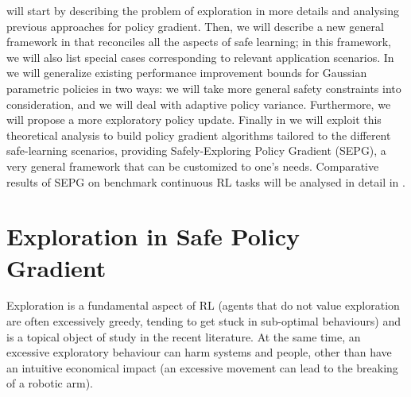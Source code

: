  will start by describing the problem of exploration in more details and analysing previous approaches for policy gradient. Then, we will describe a new general framework in  that reconciles all the aspects of safe learning; in this framework, we will also list special cases corresponding to relevant application scenarios. In  we will generalize existing performance improvement bounds for Gaussian parametric policies in two ways: we will take more general safety constraints into consideration, and we will deal with adaptive policy variance. Furthermore, we will propose a more exploratory policy update. Finally in  we will exploit this theoretical analysis to build policy gradient algorithms tailored to the different safe-learning scenarios, providing Safely-Exploring Policy Gradient (SEPG), a very general framework that can be customized to one's needs. Comparative results of SEPG on benchmark continuous RL tasks will be analysed in detail in .

\section{Exploration in Safe Policy Gradient}\label{sec:sepg-intro}
Exploration is a fundamental aspect of RL (agents that do not value exploration are often excessively greedy, tending to get stuck in sub-optimal behaviours) and is a topical object of study in the recent literature. At the same time, an excessive exploratory behaviour can harm systems and people, other than have an intuitive economical impact (\eg an excessive movement can lead to the breaking of a robotic arm).

